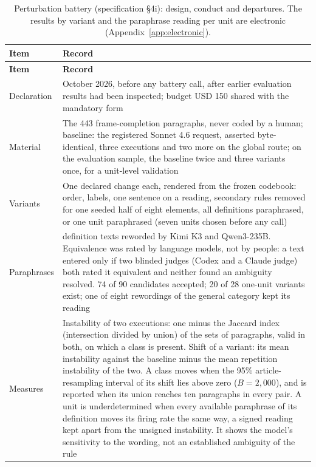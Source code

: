 \begingroup\scriptsize
\setlength{\tabcolsep}{4pt}
\begin{longtable}{@{}>{\raggedright\arraybackslash}p{27mm}>{\raggedright\arraybackslash}p{127mm}@{}}
\caption[Battery: design and conduct]{Perturbation battery (specification \S4i): design, conduct and departures. The results by variant and the paraphrase reading per unit are electronic (Appendix~\ref{app:electronic}).}\label{tab:battery_design} \\
\toprule
\textbf{Item} & \textbf{Record} \\
\midrule
\endfirsthead
\toprule
\textbf{Item} & \textbf{Record} \\
\midrule
\endhead
\bottomrule
\endfoot
Declaration & 30 October 2026, before any battery call, after earlier evaluation results had been inspected; budget USD 150 shared with the mandatory form \\
Material & The 443 frame-completion paragraphs, never coded by a human; baseline: the registered Sonnet 4.6 request, asserted byte-identical, three executions and two more on the global route; on the evaluation sample, the baseline twice and three variants once, for a unit-level validation \\
Variants & One declared change each, rendered from the frozen codebook: order, labels, one sentence on a reading, secondary rules removed for one seeded half of eight elements, all definitions paraphrased, or one unit paraphrased (seven units chosen before any call) \\
Paraphrases & 33 definition texts reworded by Kimi K3 and Qwen3-235B. Equivalence was rated by language models, not by people: a text entered only if two blinded judges (Codex and a Claude judge) both rated it equivalent and neither found an ambiguity resolved. 74 of 90 candidates accepted; 20 of 28 one-unit variants exist; one of eight rewordings of the general category kept its reading \\
Measures & Instability of two executions: one minus the Jaccard index (intersection divided by union) of the sets of paragraphs, valid in both, on which a class is present. Shift of a variant: its mean instability against the baseline minus the mean repetition instability of the two. A class moves when the 95\% article-resampling interval of its shift lies above zero ($B = 2{,}000$), and is reported when its union reaches ten paragraphs in every pair. A unit is underdetermined when every available paraphrase of its definition moves its firing rate the same way, a signed reading kept apart from the unsigned instability. It shows the model's sensitivity to the wording, not an established ambiguity of the rule \\

\end{longtable}
